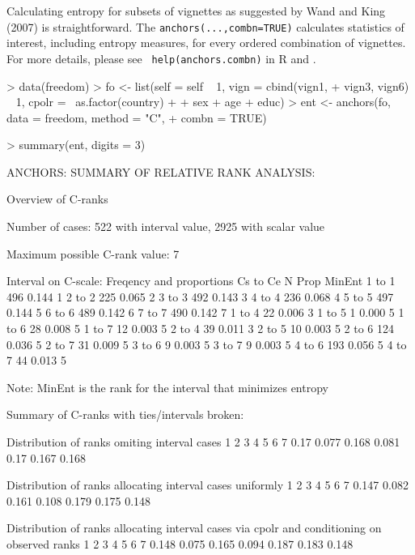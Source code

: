 \documentclass{amsart}
\newcommand{\code}[1]{{\texttt{#1}}}
\begin{document}
Calculating entropy for subsets of vignettes as suggested by Wand and
King (2007) is straightforward.  The \code{anchors(...,combn=TRUE)}
calculates statistics of interest, including entropy measures, for
every ordered combination of vignettes.  For more details, please see {\tt
help(anchors.combn)} in R and \cite{king.wand:2007}.
\begin{Schunk}
\begin{Sinput}
> data(freedom)
> fo <- list(self = self ~ 1, vign = cbind(vign1, 
+     vign3, vign6) ~ 1, cpolr = ~as.factor(country) + 
+     sex + age + educ)
> ent <- anchors(fo, data = freedom, method = "C", 
+     combn = TRUE)
\end{Sinput}
\end{Schunk}
\begin{Schunk}
\begin{Sinput}
> summary(ent, digits = 3)
\end{Sinput}
\begin{Soutput}
ANCHORS: SUMMARY OF RELATIVE RANK ANALYSIS:

Overview of C-ranks

Number of cases: 522 with interval value, 2925 with scalar value

Maximum possible C-rank value: 7

Interval on C-scale: Freqency and proportions Cs to Ce
           N  Prop MinEnt
 1 to  1 496 0.144      1
 2 to  2 225 0.065      2
 3 to  3 492 0.143      3
 4 to  4 236 0.068      4
 5 to  5 497 0.144      5
 6 to  6 489 0.142      6
 7 to  7 490 0.142      7
 1 to  4  22 0.006      3
 1 to  5   1 0.000      5
 1 to  6  28 0.008      5
 1 to  7  12 0.003      5
 2 to  4  39 0.011      3
 2 to  5  10 0.003      5
 2 to  6 124 0.036      5
 2 to  7  31 0.009      5
 3 to  6   9 0.003      5
 3 to  7   9 0.003      5
 4 to  6 193 0.056      5
 4 to  7  44 0.013      5

Note: MinEnt is the rank for the interval that minimizes entropy

Summary of C-ranks with ties/intervals broken:

Distribution of ranks omiting interval cases
    1     2     3     4    5     6     7
 0.17 0.077 0.168 0.081 0.17 0.167 0.168

Distribution of ranks allocating interval cases uniformly
     1     2     3     4     5     6     7
 0.147 0.082 0.161 0.108 0.179 0.175 0.148

Distribution of ranks allocating interval cases via cpolr
and conditioning on observed ranks
    1     2     3     4     5     6     7 
0.148 0.075 0.165 0.094 0.187 0.183 0.148 


\end{Soutput}
\end{Schunk}
\end{document}
